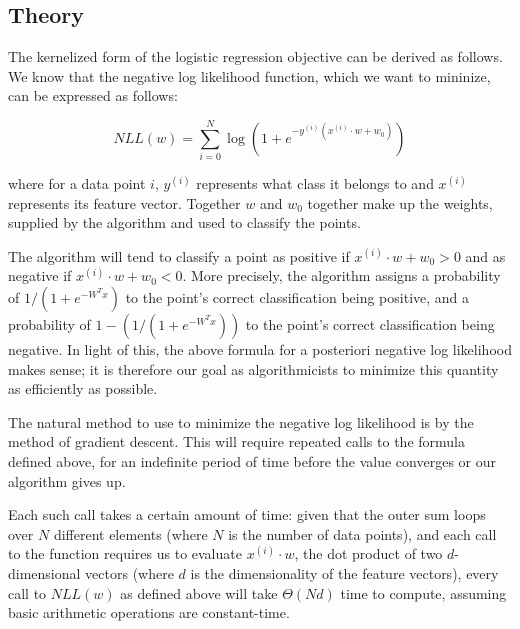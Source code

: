 \documentclass{sigchi}
\begin{document}
\subsection{Theory}

The kernelized form of the logistic regression objective can be derived as follows. We know that the negative log likelihood function, which we want to mininize, can be expressed as follows:

\begin{equation}NLL(w) = \sum_{i=0}^N \log(1+e^{-y^{(i)}(x^{(i)}\cdot w + w_0)})\end{equation}

where for a data point $i$, $y^{(i)}$ represents what class it belongs to and $x^{(i)}$ represents its feature vector. Together $w$ and $w_0$ together make up the weights, supplied by the algorithm and used to classify the points.

The algorithm will tend to classify a point as positive if $x^{(i)} \cdot w + w_0 > 0$ and as negative if $x^{(i)} \cdot w + w_0 < 0$. More precisely, the algorithm assigns a probability of $1/(1+e^{-W^T x})$ to the point's correct classification being positive, and a probability of $1 - (1/(1+e^{-W^T x}))$ to the point's correct classification being negative. In light of this, the above formula for a posteriori negative log likelihood makes sense; it is therefore our goal as algorithmicists to minimize this quantity as efficiently as possible.

The natural method to use to minimize the negative log likelihood is by the method of gradient descent. This will require repeated calls to the formula defined above, for an indefinite period of time before the value converges or our algorithm gives up.

Each such call takes a certain amount of time: given that the outer sum loops over $N$ different elements (where $N$ is the number of data points), and each call to the function requires us to evaluate $x^{(i)} \cdot w$, the dot product of two $d$-dimensional vectors (where $d$ is the dimensionality of the feature vectors), every call to $NLL(w)$ as defined above will take $\Theta(Nd)$ time to compute, assuming basic arithmetic operations are constant-time.

\end{document}
